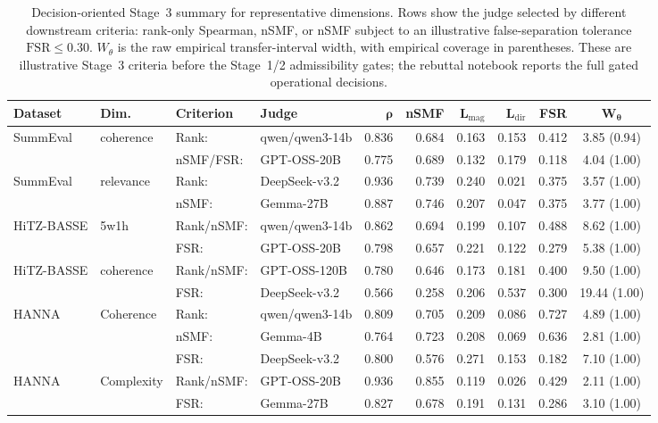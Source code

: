 \begin{table}[t]
\centering
\scriptsize
\setlength{\tabcolsep}{2.6pt}
\caption{
Decision-oriented Stage~3 summary for representative dimensions. Rows show the judge selected by different downstream criteria: rank-only Spearman, nSMF, or nSMF subject to an illustrative false-separation tolerance $\mathrm{FSR}\le 0.30$. $W_\theta$ is the raw empirical transfer-interval width, with empirical coverage in parentheses. These are illustrative Stage~3 criteria before the Stage~1/2 admissibility gates; the rebuttal notebook reports the full gated operational decisions.
}
\label{tab:stage3-decision-summary}
\begin{tabular}{ll l l rrrrr c}
\toprule
\textbf{Dataset} & \textbf{Dim.} & \textbf{Criterion} & \textbf{Judge} & $\boldsymbol{\rho}$ & \textbf{nSMF} & $\mathbf{L_{\mathrm{mag}}}$ & $\mathbf{L_{\mathrm{dir}}}$ & \textbf{FSR} & $\boldsymbol{W_{\theta}}$ \\
\midrule
SummEval & coherence & Rank: & qwen/qwen3-14b & 0.836 & 0.684 & 0.163 & 0.153 & 0.412 & 3.85 (0.94) \\
 &  & nSMF/FSR: & GPT-OSS-20B & 0.775 & 0.689 & 0.132 & 0.179 & 0.118 & 4.04 (1.00) \\
\midrule
SummEval & relevance & Rank: & DeepSeek-v3.2 & 0.936 & 0.739 & 0.240 & 0.021 & 0.375 & 3.57 (1.00) \\
 &  & nSMF: & Gemma-27B & 0.887 & 0.746 & 0.207 & 0.047 & 0.375 & 3.77 (1.00) \\
\midrule
HiTZ-BASSE & 5w1h & Rank/nSMF: & qwen/qwen3-14b & 0.862 & 0.694 & 0.199 & 0.107 & 0.488 & 8.62 (1.00) \\
 &  & FSR: & GPT-OSS-20B & 0.798 & 0.657 & 0.221 & 0.122 & 0.279 & 5.38 (1.00) \\
\midrule
HiTZ-BASSE & coherence & Rank/nSMF: & GPT-OSS-120B & 0.780 & 0.646 & 0.173 & 0.181 & 0.400 & 9.50 (1.00) \\
 &  & FSR: & DeepSeek-v3.2 & 0.566 & 0.258 & 0.206 & 0.537 & 0.300 & 19.44 (1.00) \\
\midrule
HANNA & Coherence & Rank: & qwen/qwen3-14b & 0.809 & 0.705 & 0.209 & 0.086 & 0.727 & 4.89 (1.00) \\
 &  & nSMF: & Gemma-4B & 0.764 & 0.723 & 0.208 & 0.069 & 0.636 & 2.81 (1.00) \\
 &  & FSR: & DeepSeek-v3.2 & 0.800 & 0.576 & 0.271 & 0.153 & 0.182 & 7.10 (1.00) \\
\midrule
HANNA & Complexity & Rank/nSMF: & GPT-OSS-20B & 0.936 & 0.855 & 0.119 & 0.026 & 0.429 & 2.11 (1.00) \\
 &  & FSR: & Gemma-27B & 0.827 & 0.678 & 0.191 & 0.131 & 0.286 & 3.10 (1.00) \\
\bottomrule
\end{tabular}
\end{table}